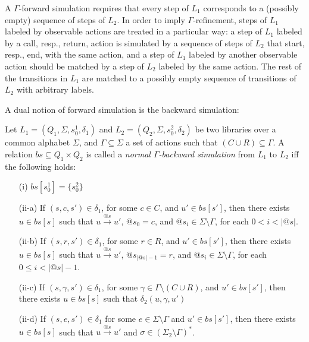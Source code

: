 A $\Gamma$-forward simulation requires that every step of $L_1$ corresponds to a (possibly empty) sequence of steps of $L_2$. In order to imply $\Gamma$-refinement, steps of $L_1$ labeled by observable actions are treated in a particular way: a step of $L_1$ labeled by a call, resp., return, action is simulated by a sequence of steps of $L_2$ that start, resp., end, with the same action, and a step of $L_1$ labeled by another observable action should be matched by a step of $L_2$ labeled by the same action. The rest of the transitions in $L_1$ are matched to a possibly empty sequence of transitions of $L_2$ with arbitrary labels.

A dual notion of forward simulation is the backward simulation:
\begin{dfn}
Let $L_1=(Q_1,\Sigma, s_0^1, \delta_1)$ and $L_2=(Q_2,\Sigma, s_0^2, \delta_2)$ be two libraries over a common alphabet $\Sigma$, and $\Gamma\subseteq \Sigma$ a set of actions such that $(C\cup R)\subseteq \Gamma$. A relation $bs \subseteq Q_1 \times Q_2$ is called a \emph{normal $\Gamma$-backward simulation} from $L_1$ to $L_2$ iff the following holds:
\begin{itemize}
\item[(i)] $bs[s_0^1] = \{s_0^2 \}$
\item[(ii-a)] If $(s,c,s') \in \delta_1$, for some $c\in C$, and $u' \in bs[s']$, then there exists $u \in bs[s]$ such that $u \xrightarrow{@s} u'$, $@s_0=c$, and $@s_i\in \Sigma\setminus\Gamma$, for each $0<i<|@s|$.
\item[(ii-b)] If $(s,r,s') \in \delta_1$, for some $r\in R$, and $u' \in bs[s']$, then there exists $u \in bs[s]$ such that $u \xrightarrow{@s} u'$, $@s_{|@s| -1}=r$, and $@s_i\in \Sigma\setminus\Gamma$, for each $0\leq i<|@s| -1$.
\item[(ii-c)] If $(s,\gamma, s') \in \delta_1$, for some $\gamma\in \Gamma\setminus (C\cup R)$, and $u' \in bs[s']$, then there exists $u \in bs[s]$ such that $\delta_2(u,\gamma,u')$
\item[(ii-d)] If $(s,e,s') \in \delta_1$ for some $e \in \Sigma\setminus \Gamma$ and $u' \in bs[s']$, then there exists $u \in bs[s]$ such that $u \xrightarrow{@s} u'$ and $\sigma\in (\Sigma_2\setminus\Gamma)^*$.
\end{itemize}
\end{dfn}

